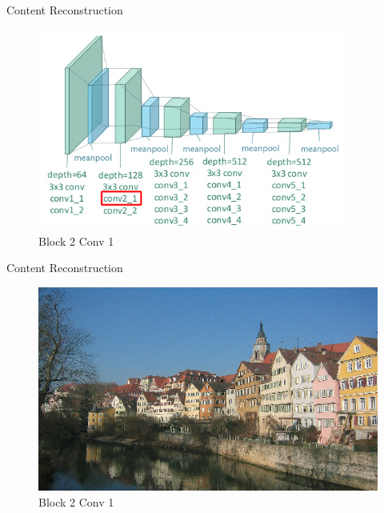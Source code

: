 \documentclass{beamer}
\begin{document}
\begin{frame}{Content Reconstruction}
\begin{figure}[ht]
\centering
\includegraphics[width=0.9\textwidth]{img/vgg19/content/block2_conv1}
\caption{Block 2 Conv 1}
\end{figure}
\end{frame}
\begin{frame}{Content Reconstruction}
\begin{figure}[ht]
\centering
\includegraphics[width=.9\textwidth]{img/content/block2_conv1.png}
\caption{Block 2 Conv 1}
\end{figure}
\end{frame}
\end{document}
